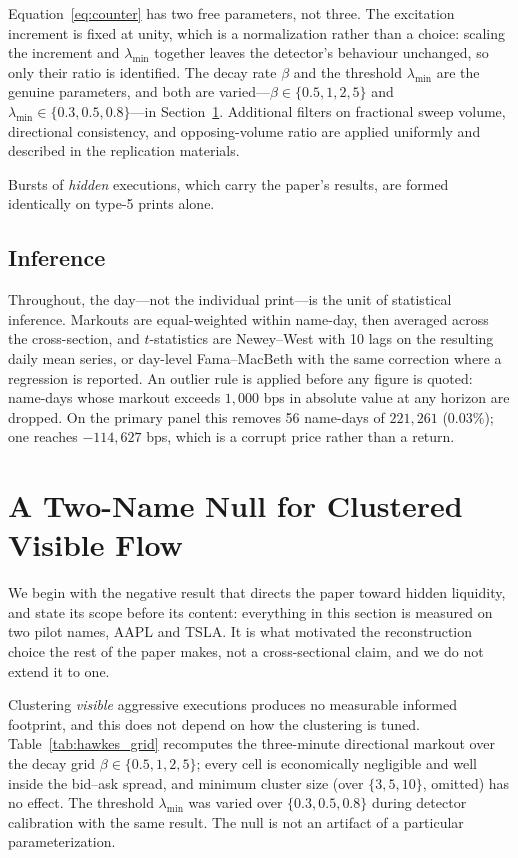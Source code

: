 \documentclass[11pt]{article}
\begin{document}
Equation~\eqref{eq:counter} has two free parameters, not three. The excitation increment is
fixed at unity, which is a normalization rather than a choice: scaling the increment and
$\lambda_{\min}$ together leaves the detector's behaviour unchanged, so only their ratio is
identified. The decay rate $\beta$ and the threshold $\lambda_{\min}$ are the genuine
parameters, and both are varied---$\beta \in \{0.5, 1, 2, 5\}$ and
$\lambda_{\min} \in \{0.3, 0.5, 0.8\}$---in Section~\ref{sec:lit}. Additional filters on
fractional sweep volume, directional consistency, and opposing-volume ratio are applied
uniformly and described in the replication materials.

Bursts of \emph{hidden} executions, which carry the paper's results, are formed identically
on type-5 prints alone.

\subsection{Inference}

Throughout, the day---not the individual print---is the unit of statistical inference.
Markouts are equal-weighted within name-day, then averaged across the cross-section, and
$t$-statistics are Newey--West \citep{neweywest1987} with 10 lags on the resulting daily
mean series, or day-level Fama--MacBeth \citep{famamacbeth1973} with the same correction
where a regression is reported. An outlier rule is applied before any figure is quoted:
name-days whose markout exceeds $1{,}000$ bps in absolute value at any horizon are dropped.
On the primary panel this removes 56 name-days of $221{,}261$ ($0.03\%$); one reaches
$-114{,}627$ bps, which is a corrupt price rather than a return.

\section{A Two-Name Null for Clustered Visible Flow}
\label{sec:lit}

We begin with the negative result that directs the paper toward hidden liquidity, and state
its scope before its content: everything in this section is measured on two pilot names,
AAPL and TSLA. It is what motivated the reconstruction choice the rest of the paper makes,
not a cross-sectional claim, and we do not extend it to one.

Clustering \emph{visible} aggressive executions produces no measurable informed footprint,
and this does not depend on how the clustering is tuned. Table~\ref{tab:hawkes_grid}
recomputes the three-minute directional markout over the decay grid
$\beta \in \{0.5,1,2,5\}$; every cell is economically negligible and well inside the
bid--ask spread, and minimum cluster size (over $\{3,5,10\}$, omitted) has no effect. The
threshold $\lambda_{\min}$ was varied over $\{0.3,0.5,0.8\}$ during detector calibration
with the same result. The null is not an artifact of a particular parameterization.
\end{document}
